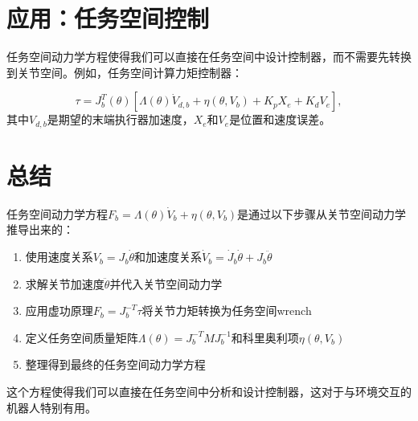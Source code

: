 \documentclass{article}
\begin{document}
\section{应用：任务空间控制}

任务空间动力学方程使得我们可以直接在任务空间中设计控制器，而不需要先转换到关节空间。例如，任务空间计算力矩控制器：

\begin{equation}
\tau = J_b^T(\theta)\left[\Lambda(\theta)\dot{V}_{d,b} + \eta(\theta, V_b) + K_p X_e + K_d V_e\right],
\end{equation}
其中$V_{d,b}$是期望的末端执行器加速度，$X_e$和$V_e$是位置和速度误差。

\section{总结}

任务空间动力学方程$F_b = \Lambda(\theta)\dot{V}_b + \eta(\theta, V_b)$是通过以下步骤从关节空间动力学推导出来的：

\begin{enumerate}
\item 使用速度关系$V_b = J_b\dot{\theta}$和加速度关系$\dot{V}_b = \dot{J}_b\dot{\theta} + J_b\ddot{\theta}$
\item 求解关节加速度$\ddot{\theta}$并代入关节空间动力学
\item 应用虚功原理$F_b = J_b^{-T}\tau$将关节力矩转换为任务空间wrench
\item 定义任务空间质量矩阵$\Lambda(\theta) = J_b^{-T}M J_b^{-1}$和科里奥利项$\eta(\theta, V_b)$
\item 整理得到最终的任务空间动力学方程
\end{enumerate}

这个方程使得我们可以直接在任务空间中分析和设计控制器，这对于与环境交互的机器人特别有用。
\end{document}
